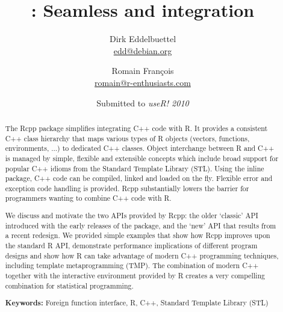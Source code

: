 \documentclass[11pt]{article}
\author{Dirk Eddelbuettel\\ {\small \url{edd@debian.org} }
  \and Romain Fran\c{c}ois\\ {\small \url{romain@r-enthusiasts.com} } }
\title{\pkg{Rcpp}: Seamless \proglang{R} and \proglang{C++} integration}
\date{Submitted to \textsl{useR! 2010}}
\newcommand{\proglang}[1]{\textsf{#1}}
\newcommand{\pkg}[1]{{\fontseries{b}\selectfont #1}}
\begin{document}
\maketitle
\thispagestyle{empty}
\begin{abstract}
  \addtolength{\parskip}{\baselineskip} 	%
  \noindent %
  The \pkg{Rcpp} package simplifies integrating \proglang{C++} code with
  \proglang{R}. It provides a consistent \proglang{C++} class hierarchy that
  maps various types of \proglang{R} objects (vectors, functions,
  environments, ...) to dedicated \proglang{C++} classes. Object interchange
  between \proglang{R} and \proglang{C++} is managed by simple, flexible and
  extensible concepts which include broad support for popular \proglang{C++}
  idioms from the Standard Template Library (STL). Using the \pkg{inline}
  package, \proglang{C++} code can be compiled, linked and loaded on the fly.
  Flexible error and exception code handling is provided.  \pkg{Rcpp}
  substantially lowers the barrier for programmers wanting to combine
  \proglang{C++} code with \proglang{R}.
  
  We discuss and motivate the two APIs provided by \pkg{Rcpp}: the older
  `classic' API introduced with the early releases of the package, and the
  `new' API that results from a recent redesign. We provided simple examples
  that show how \pkg{Rcpp} improves upon the standard \proglang{R} API,
  demonstrate performance implications of different program designs and show
  how \proglang{R} can take advantage of modern \proglang{C++} programming
  techniques, including template metaprogramming (TMP).  
  The combination of modern \proglang{C++} together with the interactive
  environment provided by \proglang{R} creates a very compelling combination
  for statistical programming.
  
  \noindent \textbf{Keywords:} Foreign function interface, 
  \proglang{R}, \proglang{C++}, Standard Template Library (STL)
\end{abstract}
\end{document}
